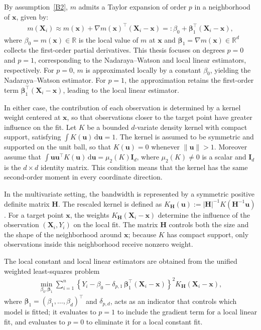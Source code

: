 \documentclass[12pt]{report} %
\newcommand{\bH}{\mathbf{H}}
\newcommand{\bX}{\mathbf{X}}
\newcommand{\bx}{\mathbf{x}}
\newcommand{\bu}{\boldsymbol{u}}
\newcommand{\rd}{\mathrm{d}}
\begin{document}
By assumption~\ref{B2}, $m$ admits a Taylor expansion of order $p$ in a neighborhood of $\bx$, given by:
\begin{align}
    \label{eq:taylor_reg}
    m(\bX_i) \approx m(\bx) + \nabla m(\bx)^\top(\bX_i - \bx)
    =: \beta_0 + \boldsymbol{\beta}_1^\top(\bX_i - \bx),
\end{align}
where $\beta_0 = m(\bx) \in \mathbb{R}$ is the local value 
of $m$ at $\bx$ and $\boldsymbol{\beta}_1 = \nabla m(\bx) 
\in \mathbb{R}^d$ collects the first-order partial derivatives. This thesis focuses on degrees $p=0$ and $p=1$, corresponding to the Nadaraya--Watson and local linear estimators, respectively. 
For $p=0$, $m$ is approximated locally by a constant $\beta_0$, yielding the Nadaraya--Watson estimator. For $p=1$, the approximation retains the first-order term $\boldsymbol{\beta}_1^\top(\bX_i-\bx)$, leading to the local linear estimator.

In either case, the contribution of each observation is determined by a kernel weight centered at $\bx$, so that observations closer to the target point have greater influence on the fit. Let $K$ be a bounded $d$-variate density kernel with compact support, satisfying $ \int K(\bu)\,\rd\bu = 1$. The kernel is assumed to be symmetric and supported on the unit ball, so that $K(\bu)=0$ whenever $\|\bu\|>1$. Moreover assume that $\int \bu\bu^\top K(\bu)\,\rd\bu = \mu_2(K)\mathbf{I}_d$, where $\mu_2(K)\neq 0$ is a scalar and $\mathbf{I}_d$ is the $d\times d$ identity matrix. This condition means that the kernel has the same second-order moment in every coordinate direction.

In the multivariate setting, the bandwidth is represented by a symmetric positive definite matrix $\bH$. The rescaled kernel is defined as $ K_{\bH}(\bu) := |\bH|^{-1} K(\bH^{-1}\bu)$.  For a target point $\bx$, the weights $K_{\bH}(\bX_i-\bx)$ determine the influence of the observation $(\bX_i,Y_i)$ on the local fit. The matrix $\bH$ controls both the size and the shape of the neighborhood around $\bx$; because $K$ has compact support, only observations inside this neighborhood receive nonzero weight.

The local constant and local linear estimators are obtained from the unified weighted least-squares problem
\begin{align}
    \label{eq:ls-euc}
    \min_{\beta_0,\boldsymbol{\beta}_1}
    \sum_{i=1}^{n}
    \left\{ Y_i - \beta_0 - \delta_{p,1}\, \boldsymbol{\beta}_1^\top(\bX_i-\bx)\right\}^2
    K_{\bH}(\bX_i-\bx),
\end{align}
where $\boldsymbol{\beta}_1=(\beta_1,\ldots,\beta_d)^\top$ and $\delta_{p,d}$, acts as an indicator that controls which model is fitted; it evaluates to $p = 1$ to include the 
gradient term for a local linear fit, and evaluates to $p = 0$ to eliminate it for a local constant fit. 
\end{document}
